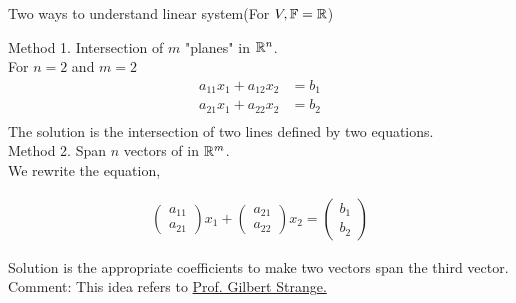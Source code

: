 \documentclass[hyperref={pdfpagelabels=true}]{beamer}
\newcommand{\structb}[1]{\textcolor[rgb]{0.2,0.2,0.7}{#1}}
\newcommand{\<}{\langle}
\renewcommand{\>}{\rangle}
\begin{document}
\begin{frame}{Two ways to understand linear system(For $V,\mathbb{F} = \mathbb{R}$)}
    \begin{block}{}
        \structb{Method 1.} Intersection of $m$ "planes" in $\mathbb{R}^{n}$.\\
        For $n = 2$ and $m = 2$
        \[
            \begin{aligned}
            a_{11}x_1+a_{12}x_2 &= b_1 \\
            a_{21}x_1+a_{22}x_2 &= b_2 \\
            \end{aligned}
        \]
        The solution is the intersection of two lines defined by two equations.\\
        \structb{Method 2.} Span $n$ vectors of in $\mathbb{R}^{m}$.\\
        We rewrite the equation,
        \begin{spacing}{0.8}
        \[
        \begin{aligned}
        \begin{pmatrix} 
            a_{11} \\ 
            a_{21} 
        \end{pmatrix}
        x_{1}+
        \begin{pmatrix} 
            a_{21} \\ 
            a_{22} 
        \end{pmatrix}
        x_{2} = 
        \begin{pmatrix} 
            b_{1} \\ 
            b_{2} 
        \end{pmatrix}
        \end{aligned}
        \]
        \end{spacing}
        Solution is the appropriate coefficients to make two vectors span the third vector.\\
        \structb{Comment:} This idea refers to \href{http://www-math.mit.edu/~gs/}{Prof. Gilbert Strange.}
 
    \end{block}
\end{frame}
\end{document}
